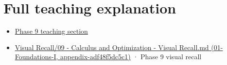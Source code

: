 \section{Full teaching explanation}\label{appendix-ab31ef447dbf-full-teaching-explanation}

\begin{itemize}
\tightlist
\item
  \href{Continuous\%20Notes/Computing\%20Foundations\%20-\%20From\%20Bits\%20to\%20C++\%20and\%20Systems\%20APIs\#Jacobians,\%20curvature,\%20and\%20local\%20approximation}{Phase 9 teaching section}
\item
  \href{../01-Foundations-I/main.pdf\#nameddest=appendix-adf48f5dc5c1}{Visual Recall/09 - Calculus and Optimization - Visual Recall.md (01-Foundations-I, appendix-adf48f5dc5c1)} · Phase 9 visual recall
\end{itemize}

